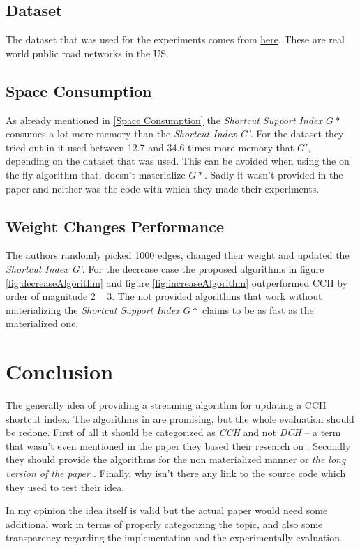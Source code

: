 \documentclass[twocolumn]{article}
\begin{document}
\subsection{Dataset}
The dataset that was used for the experiments comes from \href{http://www.dis.uniroma1.it/challenge9/download.shtml}{here}.
These are real world public road networks in the US.

\subsection{Space Consumption}

As already mentioned in \ref{Space Consumption} the \textit{Shortcut Support Index $G*$} consumes a lot more memory than 
the \textit{Shortcut Index G'}. For the dataset they tried out in \cite{Ouyang2020} it used between 12.7 and 34.6 times more
memory that $G'$, depending on the dataset that was used. This can be avoided when using the on the fly algorithm that, doesn't 
materialize $G*$. Sadly it wasn't provided in the paper and neither was the code with which they made their experiments.

\subsection{Weight Changes Performance}

The authors randomly picked 1000 edges, changed their weight and updated the \textit{Shortcut Index G'}. For the decrease case 
the proposed algorithms in figure \ref{fig:decreaseAlgorithm} and figure \ref{fig:increaseAlgorithm} outperformed 
CCH by order of magnitude 2 ~ 3. The not provided algorithms that work without materializing the \textit{Shortcut Support Index $G*$}
claims to be as fast as the materialized one.

\section{Conclusion}

The generally idea of providing a streaming algorithm for updating a CCH shortcut index. The algorithms in \cite{Ouyang2020} are
promising, but the whole evaluation should be redone. First of all it should be categorized as \textit{CCH} and not \textit{DCH} – a term that
wasn't even mentioned in the paper they based their research on \cite{Geisberger2012}. Secondly they should provide the 
algorithms for the non materialized manner or \textit{the long version of the paper \cite{Ouyang2020}}. Finally, why isn't there
any link to the source code which they used to test their idea.

In my opinion the idea itself is valid but the actual paper would need some additional work in terms of properly categorizing the topic,
and also some transparency regarding the implementation and the experimentally evaluation.
\clearpage


 
\listoffigures

\clearpage

 \label{debugDecreaseAlgorithm}
 \label{debugIncreaseAlgorithm}
\end{document}
